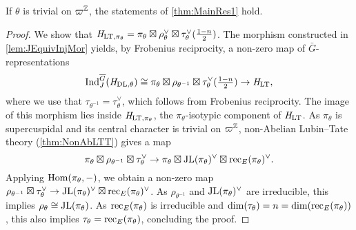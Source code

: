 \documentclass[../main.tex]{subfiles}
\begin{document}
\begin{lem}\label{lem:FirstCaseOfMainRes1}
  If $\theta$ is trivial on $\varpi^{\mathbb{Z}}$, the statements of 
  \cref{thm:MainRes1} hold.   
\begin{proof}
  We show that $\mathit H_{\mathrm{LT},\pi_\theta} = \pi_\theta \boxtimes \rho_\theta^\vee 
  \boxtimes \tau_\theta^{\vee}(\tfrac{1-n}2)$. 
  The morphism constructed in \cref{lem:JEquivInjMor} yields, by Frobenius
  reciprocity, a non-zero map of ${\bar G}$-representations
  \begin{equation} \label{eq:WantedMap}
    \operatorname{Ind}_{J}^{\overline G} (\mathit H_{\mathrm{DL},\theta}) \cong \pi_\theta \boxtimes \rho_{\theta^{-1}}
    \boxtimes \tau_\theta^\vee (\tfrac{1-n}2) \to \mathit H_{\mathrm{LT}},
  \end{equation}
  where we use that $\tau_{\theta^{-1}} = \tau_\theta^\vee$, which follows from 
  Frobenius reciprocity. The image of this morphism lies inside $\mathit H_{\mathrm{LT},
  \pi_\theta}$, the $\pi_\theta$-isotypic component of $\mathit H_{\mathrm{LT}}$. 
  As $\pi_\theta$ is supercuspidal and its central character is trivial on 
  $\varpi^{\mathbb{Z}}$, non-Abelian Lubin--Tate theory (\cref{thm:NonAbLTT}) gives 
  a map 
  \begin{equation*}
    \pi_\theta \boxtimes \rho_{\theta^{-1}} \boxtimes \tau_\theta^{\vee} \to
    \pi_\theta \boxtimes \mathrm{JL}(\pi_\theta)^\vee \boxtimes
    \mathrm{rec}_E(\pi_\theta)^\vee.
  \end{equation*}
  Applying $\operatorname{Hom}(\pi_\theta, -)$, we obtain a non-zero map 
  $\rho_{\theta^{-1}} \boxtimes \tau_\theta^{\vee} \to \mathrm{JL}(\pi_\theta)^\vee
  \boxtimes \mathrm{rec}_E(\pi_\theta)^\vee$.
  As $\rho_{\theta^{-1}}$ and $\mathrm{JL}(\pi_\theta)^\vee$ are irreducible, this 
  implies $\rho_\theta \cong \mathrm{JL}(\pi_\theta)$.
  As $\mathrm{rec}_E(\pi_\theta)$ is irreducible and $\dim(\tau_\theta) = n = \dim
  (\mathrm{rec}_E(\pi_\theta))$, this also implies $\tau_\theta = \mathrm{rec}_E(\pi_\theta)$,
  concluding the proof.
\end{proof}
\end{lem}
\end{document}
